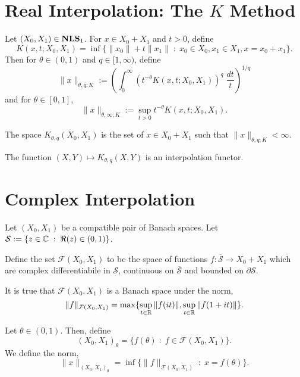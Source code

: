 \section{Real Interpolation: The $K$ Method}
\begin{definition}
    Let $(X_0,X_1) \in \mathrm{\mathbf{NLS}}_1$. For $x \in X_0+X_1$ and $t > 0$, define
    \begin{equation*}
        K(x,t;X_0,X_1) = \inf\{ \|x_0\|+t\|x_1\|\;:\;x_0 \in X_0,x_1 \in X_1,x = x_0+x_1\}.
    \end{equation*}
    Then for $\theta \in (0,1)$ and $q \in [1,\infty)$, define
    \begin{equation*}
        \|x\|_{\theta,q;K} := \left(\int_0^\infty (t^{-\theta}K(x,t;X_0,X_1))^q\;\frac{dt}{t}\right)^{1/q}
    \end{equation*}
    and for $\theta \in [0,1]$,
    \begin{equation*}
        \|x\|_{\theta,\infty;K} := \sup_{t > 0} t^{-\theta} K(x,t;X_0,X_1).
    \end{equation*}
    
    The space $K_{\theta,q}(X_0,X_1)$ is the set of $x \in X_0+X_1$
    such that $\|x\|_{\theta,q;K} < \infty$.
    
\end{definition}

\begin{proposition}
    The function $(X,Y) \mapsto K_{\theta,q}(X,Y)$ is an interpolation functor.
\end{proposition}

\section{Complex Interpolation}
\begin{definition}
    Let $(X_0,X_1)$ be a compatible pair of Banach spaces. Let $\mathcal{S} := \{z \in \mathbb{C}\;:\;\Re(z) \in (0,1)\}$. 
    
    Define the set $\mathcal{F}(X_0,X_1)$ to be the space of functions $f:\overline{\mathcal{S}}\rightarrow X_0+X_1$ which are complex differentiabile in $\mathcal{S}$, continuous on $\overline{\mathcal{S}}$
    and bounded on $\partial \mathcal{S}$.
    
    It is true that $\mathcal{F}(X_0,X_1)$ is a Banach space under the norm,
    \begin{equation*}
        \|f\|_{\mathcal{F}(X_0,X_1)} = \max\{\sup_{t \in \mathbb{R}} \|f(it)\|,\sup_{t \in \mathbb{R}}\|f(1+it)\|\}.
    \end{equation*}
    
    Let $\theta \in (0,1)$. Then, define
    \begin{equation*}
        (X_0,X_1)_\theta = \{ f(\theta)\;:\;f \in \mathcal{F}(X_0,X_1)\}.
    \end{equation*}
    We define the norm,
    \begin{equation*}
        \|x\|_{(X_0,X_1)_\theta} = \inf\{\|f\|_{\mathcal{F}(X_0,X_1)} \;:\;x = f(\theta)\}.
    \end{equation*}
\end{definition}

